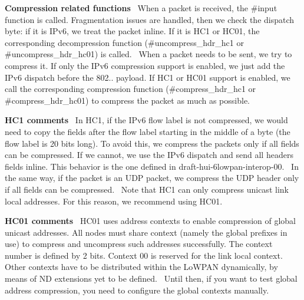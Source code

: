{\bfseries Compression related functions}~\newline
 When a packet is received, the \#input function is called. Fragmentation issues are handled, then we check the dispatch byte\+: if it is I\+Pv6, we treat the packet inline. If it is H\+C1 or H\+C01, the corresponding decompression function (\#uncompress\+\_\+hdr\+\_\+hc1 or \#uncompress\+\_\+hdr\+\_\+hc01) is called.~\newline
 When a packet needs to be sent, we try to compress it. If only the I\+Pv6 compression support is enabled, we just add the I\+Pv6 dispatch before the 802.. payload. If H\+C1 or H\+C01 support is enabled, we call the corresponding compression function (\#compress\+\_\+hdr\+\_\+hc1 or \#compress\+\_\+hdr\+\_\+hc01) to compress the packet as much as possible.

{\bfseries H\+C1 comments}~\newline
 In H\+C1, if the I\+Pv6 flow label is not compressed, we would need to copy the fields after the flow label starting in the middle of a byte (the flow label is 20 bits long). To avoid this, we compress the packets only if all fields can be compressed. If we cannot, we use the I\+Pv6 dispatch and send all headers fields inline. This behavior is the one defined in draft-\/hui-\/6lowpan-\/interop-\/00.~\newline
 In the same way, if the packet is an U\+DP packet, we compress the U\+DP header only if all fields can be compressed.~\newline
 Note that H\+C1 can only compress unicast link local addresses. For this reason, we recommend using H\+C01.

{\bfseries H\+C01 comments}~\newline
 H\+C01 uses address contexts to enable compression of global unicast addresses. All nodes must share context (namely the global prefixes in use) to compress and uncompress such addresses successfully. The context number is defined by 2 bits. Context 00 is reserved for the link local context. Other contexts have to be distributed within the Lo\+W\+P\+AN dynamically, by means of ND extensions yet to be defined.~\newline
 Until then, if you want to test global address compression, you need to configure the global contexts manually.



 